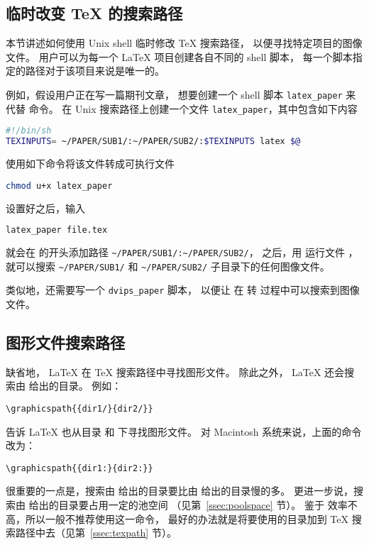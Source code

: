 \subsection{临时改变 \TeX{} 的搜索路径}\label{ssec:temptexpath}

本节讲述如何使用 Unix shell 临时修改 \TeX{} 搜索路径，
以便寻找特定项目的图像文件。
用户可以为每一个 \LaTeX{} 项目创建各自不同的 shell 脚本，
每一个脚本指定的路径对于该项目来说是唯一的。

例如，假设用户正在写一篇期刊文章，
想要创建一个 shell 脚本 \verb|latex_paper| 来代替  命令。
在 Unix 搜索路径上创建一个文件 \verb|latex_paper|，其中包含如下内容
\begin{lstlisting}[language=sh]
#!/bin/sh
TEXINPUTS= ~/PAPER/SUB1/:~/PAPER/SUB2/:$TEXINPUTS latex $@
\end{lstlisting}
使用如下命令将该文件转成可执行文件
\begin{lstlisting}[language=sh]
chmod u+x latex_paper
\end{lstlisting}

设置好之后，输入
\begin{lstlisting}[language=sh]
latex_paper file.tex
\end{lstlisting}
就会在  的开头添加路径 \verb|~/PAPER/SUB1/:~/PAPER/SUB2/|，
之后，用  运行文件 ，
就可以搜索 \verb|~/PAPER/SUB1/| 和 \verb|~/PAPER/SUB2/| 子目录下的任何图像文件。

类似地，还需要写一个 \verb|dvips_paper| 脚本，
以便让  在  转  过程中可以搜索到图像文件。

\subsection{图形文件搜索路径}\label{ssec:graphpath}
缺省地， \LaTeX{} 在 \TeX{} 搜索路径中寻找图形文件。
除此之外， \LaTeX{} 还会搜索由  给出的目录。
例如：
\begin{lstlisting}
\graphicspath{{dir1/}{dir2/}}
\end{lstlisting}
告诉 \LaTeX{} 也从目录  和  下寻找图形文件。
对 Macintosh 系统来说，上面的命令改为：
\begin{lstlisting}
\graphicspath{{dir1:}{dir2:}}
\end{lstlisting}

很重要的一点是，搜索由  给出的目录要比由  给出的目录慢的多。
更进一步说，搜索由  给出的目录要占用一定的池空间
（见第~\ref{ssec:poolspace} 节）。
鉴于  效率不高，所以一般不推荐使用这一命令，
最好的办法就是将要使用的目录加到 \TeX{} 搜索路径中去（见第~\ref{ssec:texpath} 节）。


